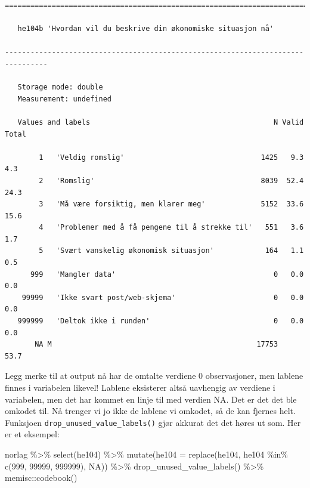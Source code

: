 \documentclass[
  letterpaper,
  DIV=11,
  numbers=noendperiod]{scrreprt}
\newenvironment{Shaded}{\begin{snugshade}}{\end{snugshade}}
\newcommand{\AttributeTok}[1]{\textcolor[rgb]{0.40,0.45,0.13}{#1}}
\newcommand{\ConstantTok}[1]{\textcolor[rgb]{0.56,0.35,0.01}{#1}}
\newcommand{\DecValTok}[1]{\textcolor[rgb]{0.68,0.00,0.00}{#1}}
\newcommand{\FunctionTok}[1]{\textcolor[rgb]{0.28,0.35,0.67}{#1}}
\newcommand{\NormalTok}[1]{\textcolor[rgb]{0.00,0.23,0.31}{#1}}
\newcommand{\SpecialCharTok}[1]{\textcolor[rgb]{0.37,0.37,0.37}{#1}}
\begin{document}
\begin{verbatim}
================================================================================

   he104b 'Hvordan vil du beskrive din økonomiske situasjon nå'

--------------------------------------------------------------------------------

   Storage mode: double
   Measurement: undefined

   Values and labels                                           N Valid Total
                                                                            
        1   'Veldig romslig'                                1425   9.3   4.3
        2   'Romslig'                                       8039  52.4  24.3
        3   'Må være forsiktig, men klarer meg'             5152  33.6  15.6
        4   'Problemer med å få pengene til å strekke til'   551   3.6   1.7
        5   'Svært vanskelig økonomisk situasjon'            164   1.1   0.5
      999   'Mangler data'                                     0   0.0   0.0
    99999   'Ikke svart post/web-skjema'                       0   0.0   0.0
   999999   'Deltok ikke i runden'                             0   0.0   0.0
       NA M                                                17753        53.7
\end{verbatim}

Legg merke til at output nå har de omtalte verdiene 0 observasjoner, men
lablene finnes i variabelen likevel! Lablene eksisterer altså uavhengig
av verdiene i variabelen, men det har kommet en linje til med verdien
NA. Det er det det ble omkodet til. Nå trenger vi jo ikke de lablene vi
omkodet, så de kan fjernes helt. Funksjoen
\texttt{drop\_unused\_value\_labels()} gjør akkurat det det høres ut
som. Her er et eksempel:

\begin{Shaded}
\begin{Highlighting}[]
\NormalTok{norlag }\SpecialCharTok{\%\textgreater{}\%} 
  \FunctionTok{select}\NormalTok{(he104) }\SpecialCharTok{\%\textgreater{}\%} 
  \FunctionTok{mutate}\NormalTok{(}\AttributeTok{he104 =} \FunctionTok{replace}\NormalTok{(he104, }
\NormalTok{                         he104 }\SpecialCharTok{\%in\%} \FunctionTok{c}\NormalTok{(}\DecValTok{999}\NormalTok{, }\DecValTok{99999}\NormalTok{, }\DecValTok{999999}\NormalTok{), }
                         \ConstantTok{NA}\NormalTok{)) }\SpecialCharTok{\%\textgreater{}\%}  
  \FunctionTok{drop\_unused\_value\_labels}\NormalTok{() }\SpecialCharTok{\%\textgreater{}\%} 
\NormalTok{  memisc}\SpecialCharTok{::}\FunctionTok{codebook}\NormalTok{()}
\end{Highlighting}
\end{Shaded}
\end{document}
